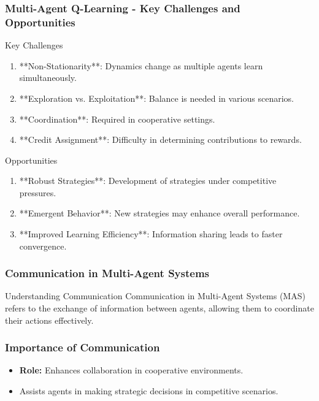 \documentclass[aspectratio=169]{beamer}
\begin{document}
\begin{frame}[fragile]
    \frametitle{Multi-Agent Q-Learning - Key Challenges and Opportunities}
    \begin{block}{Key Challenges}
        \begin{enumerate}
            \item **Non-Stationarity**: Dynamics change as multiple agents learn simultaneously.
            \item **Exploration vs. Exploitation**: Balance is needed in various scenarios.
            \item **Coordination**: Required in cooperative settings.
            \item **Credit Assignment**: Difficulty in determining contributions to rewards.
        \end{enumerate}
    \end{block}
    
    \begin{block}{Opportunities}
        \begin{enumerate}
            \item **Robust Strategies**: Development of strategies under competitive pressures.
            \item **Emergent Behavior**: New strategies may enhance overall performance.
            \item **Improved Learning Efficiency**: Information sharing leads to faster convergence.
        \end{enumerate}
    \end{block}
\end{frame}

\begin{frame}[fragile]
  \frametitle{Communication in Multi-Agent Systems}
  \begin{block}{Understanding Communication}
    Communication in Multi-Agent Systems (MAS) refers to the exchange of information between agents, allowing them to coordinate their actions effectively.
  \end{block}
\end{frame}

\begin{frame}[fragile]
  \frametitle{Importance of Communication}
  \begin{itemize}
    \item \textbf{Role:} Enhances collaboration in cooperative environments.
    \item Assists agents in making strategic decisions in competitive scenarios.
  \end{itemize}
\end{frame}
\end{document}
